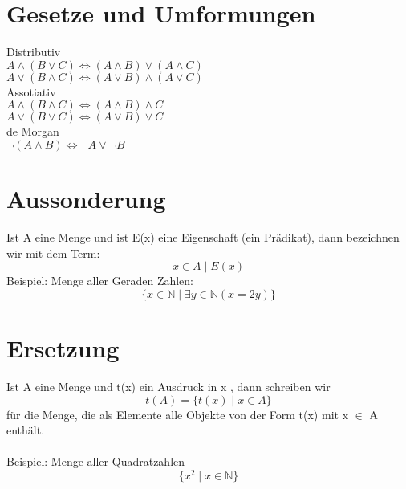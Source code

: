 \section{Gesetze und Umformungen}
Distributiv\\
\(A \wedge (B \vee C) \Leftrightarrow (A \wedge B) \vee (A \wedge C)\)\\
\(A \vee (B \wedge C) \Leftrightarrow (A \vee B) \wedge (A \vee C)\)\\

Assotiativ\\
\(A \wedge (B \wedge C) \Leftrightarrow (A \wedge B) \wedge C\)\\
\(A \vee (B \vee C) \Leftrightarrow (A \vee B) \vee C\)\\

de Morgan\\
\(\neg (A \wedge B) \Leftrightarrow \neg A \vee \neg B\)\\

\section{Aussonderung}
Ist A eine Menge und ist E(x) eine Eigenschaft (ein Prädikat), dann
bezeichnen wir mit dem Term:
\begin{equation}
    x \in A \mid E(x)
\end{equation}
Beispiel: Menge aller Geraden Zahlen:
\begin{equation}
    \{x \in \mathbb{N} \mid \exists{y} \in \mathbb{N}(x= 2y)\}
\end{equation}
\section{Ersetzung}
Ist A eine Menge und t(x) ein Ausdruck in x , dann schreiben wir
\begin{equation}
    t(A) = \{t(x) \mid x \in A\}
\end{equation}
für die Menge, die als Elemente alle Objekte von der Form t(x) mit
x \(\in\) A enthält.\\\\
Beispiel: Menge aller Quadratzahlen
\begin{equation}
    \{x^2 \mid x \in \mathbb{N}\}
\end{equation}

